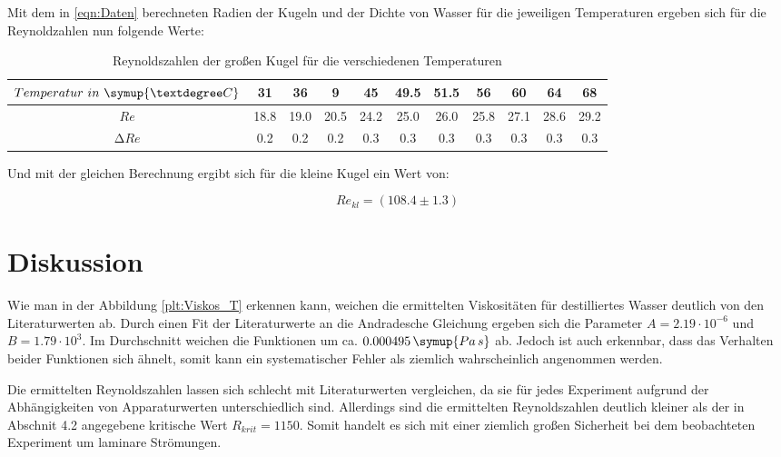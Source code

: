 Mit dem in \eqref{eqn:Daten} berechneten Radien der Kugeln und der Dichte von Wasser
für die jeweiligen Temperaturen ergeben sich für die Reynoldzahlen nun folgende
Werte:

\begin{table}
  \caption{Reynoldszahlen der großen Kugel für die verschiedenen Temperaturen}
  \label{tab:Reynolds}
  \begin{tabular}{c | c c c c c c c c c c }
    \toprule
    $Temperatur \,\, in \,\, \symup{°C}$ & 31 & 36 & 9 & 45 & 49.5 & 51.5 & 56 & 60 & 64 & 68 \\
    \midrule
    $Re$                            & 18.8 & 19.0 & 20.5 & 24.2 & 25.0 & 26.0 & 25.8 & 27.1 & 28.6 & 29.2 \\
    $\increment Re $                & 0.2 & 0.2 & 0.2 & 0.3 & 0.3 & 0.3 & 0.3 & 0.3 & 0.3 & 0.3 \\
    \bottomrule
  \end{tabular}
\end{table}

Und mit der gleichen Berechnung ergibt sich für die kleine Kugel ein Wert von:

\begin{equation}
  Re_{kl} = (108.4 \pm 1.3)
\end{equation}

\section{Diskussion}

Wie man in der Abbildung \ref{plt:Viskos_T} erkennen kann,
weichen die ermittelten Viskositäten für destilliertes Wasser deutlich von den
Literaturwerten ab. Durch einen Fit der Literaturwerte an die Andradesche Gleichung
ergeben sich die Parameter $ A = 2.19 \cdot 10^{-6} $ und $ B = 1.79 \cdot 10^{3} $.
Im Durchschnitt weichen die Funktionen um ca. $ 0.000495 \, \symup{Pa \, s}$ ab.
Jedoch ist auch erkennbar, dass das Verhalten beider Funktionen sich ähnelt, somit
kann ein systematischer Fehler als ziemlich wahrscheinlich angenommen werden.

Die ermittelten Reynoldszahlen lassen sich schlecht mit Literaturwerten vergleichen,
da sie für jedes Experiment aufgrund der Abhängigkeiten von Apparaturwerten
unterschiedlich sind. Allerdings sind die ermittelten Reynoldszahlen deutlich
kleiner als der in Abschnit 4.2 angegebene kritische Wert $R_{krit} = 1150$.
Somit handelt es sich mit einer ziemlich großen Sicherheit bei dem beobachteten
Experiment um laminare Strömungen.

